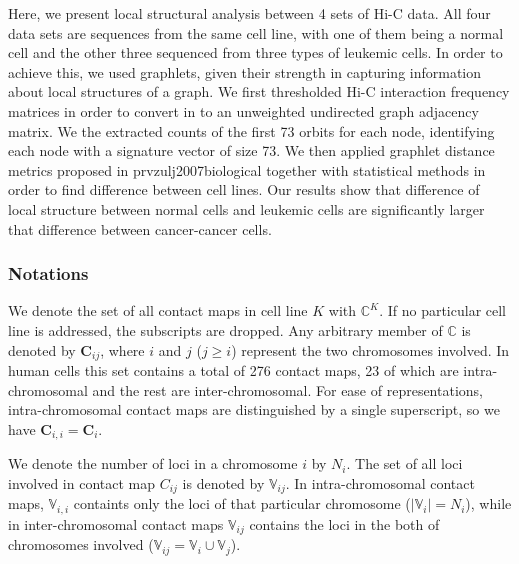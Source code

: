 \documentclass[a4,center,fleqn]{NAR}
\begin{document}
Here, we present local structural analysis between
4 sets of Hi-C data. All four data sets are sequences
from the same cell line, with one of them being
a normal cell and the other three sequenced from
three types of leukemic cells. In order to achieve
this, we used graphlets, given their strength in
capturing information about local structures of
a graph. We first thresholded Hi-C interaction frequency
matrices in order to convert in to an unweighted undirected
graph adjacency matrix. We the extracted counts of
the first 73 orbits for each node, identifying each
node with a signature vector of size 73. We then
applied graphlet distance metrics proposed in
{prvzulj2007biological} together with statistical methods
in order to find difference between cell lines.
Our results show that difference of local structure
between normal cells and leukemic cells are significantly
larger that difference between cancer-cancer cells.  

\subsubsection{Notations}

We denote the set of all contact maps in cell line $K$ with 
$\mathbb{C}^K$. If no particular cell line is addressed, the
subscripts are dropped.
Any arbitrary member of $\mathbb{C}$ is denoted by 
$\mathbf{C}_{ij}$, where $i$ and $j$ ($j \ge i$) 
represent the two chromosomes involved. 
In human cells this set contains a total of 276 contact maps,
23 of which are intra-chromosomal and the rest are inter-chromosomal.
For ease of representations, intra-chromosomal contact maps are
distinguished by a single superscript, so we have $\mathbf{C}_{i,i} =
\mathbf{C}_i$.

We denote the number of loci in a chromosome $i$ by $N_i$.
The set of all loci involved in contact map $C_{ij}$ is denoted 
by $\mathbb{V}_{ij}$.
In intra-chromosomal contact maps, $\mathbb{V}_{i,i}$ containts only the 
loci of that particular chromosome ($|\mathbb{V}_i| = N_i$), while in 
inter-chromosomal contact maps $\mathbb{V}_{ij}$ contains the loci in
the both of chromosomes involved 
($\mathbb{V}_{ij} = \mathbb{V}_i \cup \mathbb{V}_j$).
\end{document}
